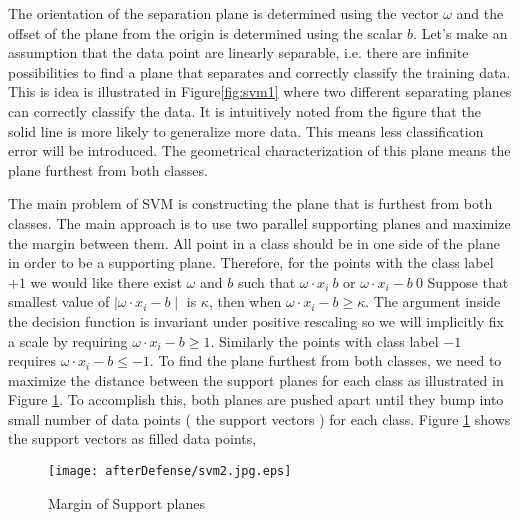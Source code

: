 The orientation of the separation plane is determined using the vector $\omega$ and the offset of the plane from the origin is determined using the scalar $b$.   Let's make an assumption that the data point are linearly separable, i.e. there are infinite possibilities to find a plane that separates and correctly classify the training data. This is idea is illustrated in Figure\ref{fig:svm1} where two different separating planes can correctly classify the data. It is intuitively noted from the figure that the solid line is more likely to generalize more data. This means less classification error will be introduced. The geometrical characterization of this plane means the plane furthest from both classes.     %
 
The main problem of SVM is constructing the plane that is furthest from both classes. The main approach is to use two parallel supporting planes and maximize the margin between them. All point in a class should be in one side of the plane in order to be a supporting plane.  Therefore, for the points with the class label $+1$ we would like there exist $\omega$ and $b$ such that $\omega \cdot x_i\> b$ or $\omega \cdot x_i -b \> 0$%
Suppose that smallest value of $\mid \omega \cdot x_i -b\mid$ is $\kappa$, then when $ \omega \cdot x_i -b \geq \kappa$. The argument inside the decision function is invariant under positive rescaling so we will implicitly fix a scale by requiring $\omega \cdot x_i -b \geq 1 $. Similarly the points with class label $-1$ requires $\omega \cdot x_i -b \leq -1 $. To find the plane furthest from both classes, we need to maximize the distance between the support planes for each class as illustrated in Figure \ref{fig:svm2}. To accomplish this, both planes are pushed apart until they bump into small number of data points ( the support vectors ) for each class. Figure \ref{fig:svm2} shows the support vectors as filled data points, 
\begin{figure}
	\centering
		\texttt{[image: afterDefense/svm2.jpg.eps]}
	\caption{Margin of Support planes }
	\label{fig:svm2}
\end{figure}


